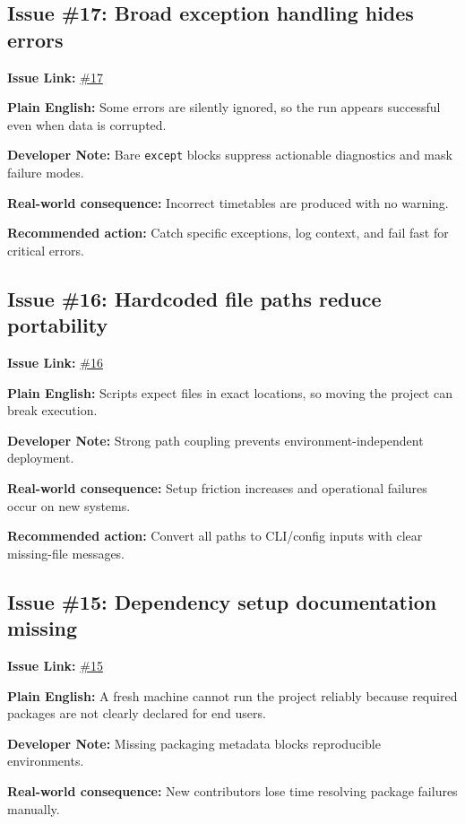 \documentclass[12pt,a4paper]{article}
\begin{document}
\subsection*{Issue \#17: Broad exception handling hides errors}
\textbf{Issue Link:} \href{https://github.com/ArnavBallinCode/TimetableIIITDWD/issues/17}{\#17}

\textbf{Plain English:} Some errors are silently ignored, so the run appears successful even when data is corrupted.

\textbf{Developer Note:} Bare \texttt{except} blocks suppress actionable diagnostics and mask failure modes.

\textbf{Real-world consequence:} Incorrect timetables are produced with no warning.

\textbf{Recommended action:} Catch specific exceptions, log context, and fail fast for critical errors.

\subsection*{Issue \#16: Hardcoded file paths reduce portability}
\textbf{Issue Link:} \href{https://github.com/ArnavBallinCode/TimetableIIITDWD/issues/16}{\#16}

\textbf{Plain English:} Scripts expect files in exact locations, so moving the project can break execution.

\textbf{Developer Note:} Strong path coupling prevents environment-independent deployment.

\textbf{Real-world consequence:} Setup friction increases and operational failures occur on new systems.

\textbf{Recommended action:} Convert all paths to CLI/config inputs with clear missing-file messages.

\subsection*{Issue \#15: Dependency setup documentation missing}
\textbf{Issue Link:} \href{https://github.com/ArnavBallinCode/TimetableIIITDWD/issues/15}{\#15}

\textbf{Plain English:} A fresh machine cannot run the project reliably because required packages are not clearly declared for end users.

\textbf{Developer Note:} Missing packaging metadata blocks reproducible environments.

\textbf{Real-world consequence:} New contributors lose time resolving package failures manually.
\end{document}
